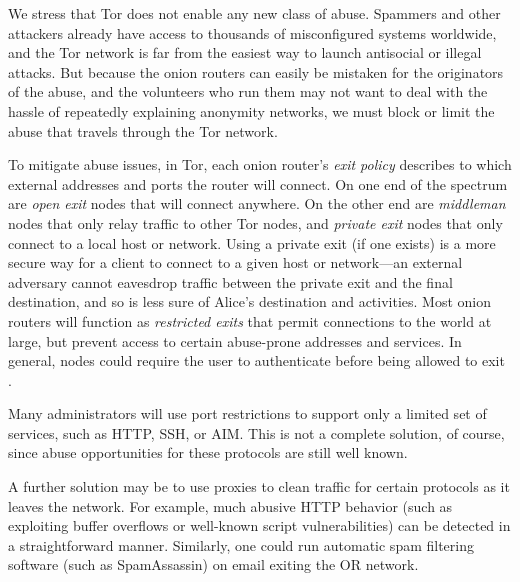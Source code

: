 \documentclass[times,10pt,twocolumn]{article}
\begin{document}
We stress that Tor does not enable any new class of abuse. Spammers
and other attackers already have access to thousands of misconfigured
systems worldwide, and the Tor network is far from the easiest way
to launch antisocial or illegal attacks.
But because the
onion routers can easily be mistaken for the originators of the abuse,
and the volunteers who run them may not want to deal with the hassle of
repeatedly explaining anonymity networks, we must block or limit
the abuse that travels through the Tor network.

To mitigate abuse issues, in Tor, each onion router's \emph{exit policy}
describes to which external addresses and ports the router will
connect. On one end of the spectrum are \emph{open exit}
nodes that will connect anywhere. On the other end are \emph{middleman}
nodes that only relay traffic to other Tor nodes, and \emph{private exit}
nodes that only connect to a local host or network.  Using a private
exit (if one exists) is a more secure way for a client to connect to a
given host or network---an external adversary cannot eavesdrop traffic
between the private exit and the final destination, and so is less sure of
Alice's destination and activities. Most onion routers will function as
\emph{restricted exits} that permit connections to the world at large,
but prevent access to certain abuse-prone addresses and services. 
In general, nodes could require the user to authenticate before
being allowed to exit \cite{or-discex00}.


Many administrators will use port restrictions to support only a
limited set of services, such as HTTP, SSH, or AIM.
This is not a complete solution, of course, since abuse opportunities for these
protocols are still well known.

A further solution may be to use proxies to clean traffic for certain
protocols as it leaves the network.  For example, much abusive HTTP
behavior (such as exploiting buffer overflows or well-known script
vulnerabilities) can be detected in a straightforward manner.
Similarly, one could run automatic spam filtering software (such as
SpamAssassin) on email exiting the OR network.
\end{document}
